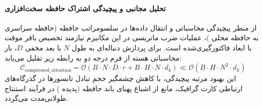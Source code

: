 \paragraph{تحلیل مجانبی و پیچیدگی اشتراک حافظه سخت‌افزاری}
از منظر پیچیدگی محاسباتی و انتقال داده‌ها در سلسومراتب حافظه (حافظه سراسری  به حافظه محلی )، عملیات ضرب ماتریسی در این مکانیزم نیازمند تخصیص بافر موقت با ابعاد فاکتورگیری‌شده است. برای پردازش دنباله‌ای به طول $N$ با بعد مخفی $D$، بار محاسباتی هسته از فرم درجه دو به رابطه زیر تقلیل می‌یابد:
\begin{equation}
\label{eq:complexity_compressed_attention}
\mathcal{C}_{\text{compressed\_attention}} = \mathcal{O}\left( B \cdot N \cdot D \cdot r + B \cdot H \cdot N \cdot d_k \right) \ll \mathcal{O}\left( B \cdot H \cdot N^2 \cdot d_k \right)
\end{equation}
این بهبود مرتبه پیچیدگی، با کاهش چشمگیر حجم تبادل تانسورها در گذرگاه‌های ارتباطی کارت گرافیک، مانع از اشباع پهنای باند حافظه (پدیده ) در فرآیند استنتاج طولانی‌مدت می‌گردد.
